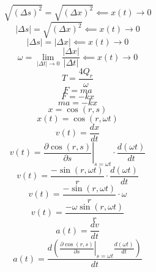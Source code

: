 \documentclass[a4paper,12pt]{report}
\begin{document}
\begin{equation}
\sqrt{(\Delta s)^2} = \sqrt{(\Delta x)^2} \impliedby x(t) \to 0
\end{equation}
\begin{equation}
\left|\Delta s\right| = \sqrt{(\Delta x)^2} \impliedby x(t) \to 0
\end{equation}
\begin{equation}
\left|\Delta s\right| = \left|\Delta x\right| \impliedby x(t) \to 0
\end{equation}
\begin{equation}
\omega = \lim \limits_{\left|\Delta t\right| \to 0} \frac{\left|\Delta x\right|}{\left|\Delta t\right|} \impliedby x(t) \to 0
\end{equation}
\begin{equation}
T = \frac{4Q_r}{\omega}
\end{equation}
\begin{equation}
F = ma
\end{equation}
\begin{equation}
F = -kx
\end{equation}
\begin{equation}
ma = -kx
\end{equation}
\begin{equation}
x = \cos(r,s)
\end{equation}
\begin{equation}
x(t) = \cos(r,\omega t)
\end{equation}
\begin{equation}
v(t) = \frac{dx}{dt}
\end{equation}
\begin{equation}
v(t) = \left.\frac{\partial \cos(r,s)}{\partial s}\right|_{s = \omega t} \cdot \frac{d (\omega t)}{dt}
\end{equation}
\begin{equation}
v(t) = \frac{-\sin(r,\omega t)}{r} \cdot \frac{d (\omega t)}{dt}
\end{equation}
\begin{equation}
v(t) = \frac{-\sin(r,\omega t)}{r} \cdot \omega
\end{equation}
\begin{equation}
v(t) = \frac{-\omega \sin(r,\omega t)}{r}
\end{equation}
\begin{equation}
a(t) = \frac{dv}{dt}
\end{equation}
\begin{equation}
a(t) = \frac{d \left(\left.\frac{\partial \cos(r,s)}{\partial s}\right|_{s = \omega t} \frac{d (\omega t)}{dt}\right)}{dt}
\end{equation}
\end{document}
